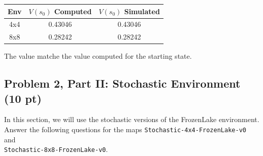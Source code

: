 \documentclass[12pt]{article}
\begin{document}
\begin{enumerate}[a)]
\begin{solution}
\begin{center}
  \begin{tabular}{|c|c|c|}\hline
    {\bf Env} & {\bf $V(s_0)$ Computed} & {\bf $V(s_0)$ Simulated}  \\ \hline
    4x4  & 0.43046 & 0.43046 \\ \hline
    8x8  & 0.28242 & 0.28242 \\ \hline
  \end{tabular}
\end{center}
The value matche the value computed for the starting state.
\end{solution}

\end{enumerate}

\subsection*{Problem 2, Part II: Stochastic Environment (10 pt)}

In this section, we will use the stochastic versions of the FrozenLake environment. Answer the following questions for the maps
\texttt{Stochastic-4x4-FrozenLake-v0} and \\
\texttt{Stochastic-8x8-FrozenLake-v0}.
\end{document}
